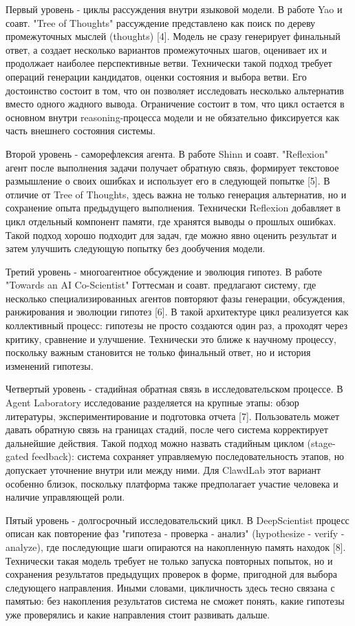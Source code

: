 Первый уровень - циклы рассуждения внутри языковой модели. В работе Yao и соавт. "Tree of Thoughts" рассуждение представлено как поиск по дереву промежуточных мыслей (thoughts) [4]. Модель не сразу генерирует финальный ответ, а создает несколько вариантов промежуточных шагов, оценивает их и продолжает наиболее перспективные ветви. Технически такой подход требует операций генерации кандидатов, оценки состояния и выбора ветви. Его достоинство состоит в том, что он позволяет исследовать несколько альтернатив вместо одного жадного вывода. Ограничение состоит в том, что цикл остается в основном внутри reasoning-процесса модели и не обязательно фиксируется как часть внешнего состояния системы.

Второй уровень - саморефлексия агента. В работе Shinn и соавт. "Reflexion" агент после выполнения задачи получает обратную связь, формирует текстовое размышление о своих ошибках и использует его в следующей попытке [5]. В отличие от Tree of Thoughts, здесь важна не только генерация альтернатив, но и сохранение опыта предыдущего выполнения. Технически Reflexion добавляет в цикл отдельный компонент памяти, где хранятся выводы о прошлых ошибках. Такой подход хорошо подходит для задач, где можно явно оценить результат и затем улучшить следующую попытку без дообучения модели.

Третий уровень - многоагентное обсуждение и эволюция гипотез. В работе "Towards an AI Co-Scientist" Готтесман и соавт. предлагают систему, где несколько специализированных агентов повторяют фазы генерации, обсуждения, ранжирования и эволюции гипотез [6]. В такой архитектуре цикл реализуется как коллективный процесс: гипотезы не просто создаются один раз, а проходят через критику, сравнение и улучшение. Технически это ближе к научному процессу, поскольку важным становится не только финальный ответ, но и история изменений гипотезы.

Четвертый уровень - стадийная обратная связь в исследовательском процессе. В Agent Laboratory исследование разделяется на крупные этапы: обзор литературы, экспериментирование и подготовка отчета [7]. Пользователь может давать обратную связь на границах стадий, после чего система корректирует дальнейшие действия. Такой подход можно назвать стадийным циклом (stage-gated feedback): система сохраняет управляемую последовательность этапов, но допускает уточнение внутри или между ними. Для ClawdLab этот вариант особенно близок, поскольку платформа также предполагает участие человека и наличие управляющей роли.

Пятый уровень - долгосрочный исследовательский цикл. В DeepScientist процесс описан как повторение фаз "гипотеза - проверка - анализ" (hypothesize - verify - analyze), где последующие шаги опираются на накопленную память находок [8]. Технически такая модель требует не только запуска повторных попыток, но и сохранения результатов предыдущих проверок в форме, пригодной для выбора следующего направления. Иными словами, цикличность здесь тесно связана с памятью: без накопления результатов система не сможет понять, какие гипотезы уже проверялись и какие направления стоит развивать дальше.

